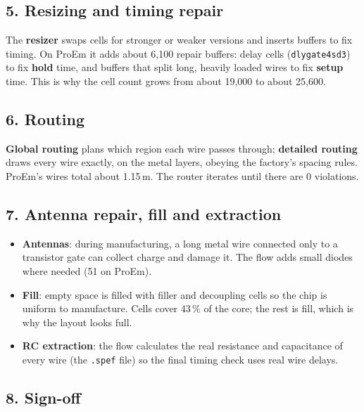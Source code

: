 \documentclass[11pt,a4paper]{article}
\newcommand{\file}[1]{\texttt{#1}}
\begin{document}
\subsection{5. Resizing and timing repair}

The \textbf{resizer} swaps cells for stronger or weaker versions and inserts buffers to fix timing. On ProEm it adds about 6,100 repair buffers: delay cells (\texttt{dlygate4sd3}) to fix \textbf{hold} time, and buffers that split long, heavily loaded wires to fix \textbf{setup} time. This is why the cell count grows from about 19,000 to about 25,600.

\subsection{6. Routing}

\textbf{Global routing} plans which region each wire passes through; \textbf{detailed routing} draws every wire exactly, on the metal layers, obeying the factory's spacing rules. ProEm's wires total about 1.15\,m. The router iterates until there are 0 violations.

\subsection{7. Antenna repair, fill and extraction}

\begin{itemize}
\item \textbf{Antennas}: during manufacturing, a long metal wire connected only to a transistor gate can collect charge and damage it. The flow adds small diodes where needed (51 on ProEm).
\item \textbf{Fill}: empty space is filled with filler and decoupling cells so the chip is uniform to manufacture. Cells cover 43\,\% of the core; the rest is fill, which is why the layout looks full.
\item \textbf{RC extraction}: the flow calculates the real resistance and capacitance of every wire (the \file{.spef} file) so the final timing check uses real wire delays.
\end{itemize}

\subsection{8. Sign-off}
\end{document}
